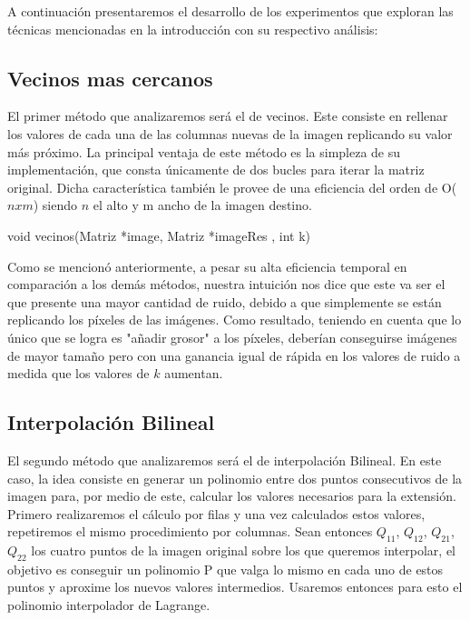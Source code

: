 A continuación presentaremos el desarrollo de los experimentos que exploran las técnicas mencionadas en la introducción con su respectivo análisis:

\subsection{Vecinos mas cercanos}
El primer método que analizaremos será el de vecinos. Este consiste en rellenar los valores de cada una de las columnas
nuevas de la imagen replicando su valor más próximo. La principal ventaja de este método es la simpleza de su implementación, que consta únicamente de dos bucles para iterar la matriz original. Dicha característica también le provee de una eficiencia del orden de O($nxm$) siendo $n$ el alto y m ancho de la imagen destino.

\begin{algorithm}[H]
\begin{algorithmic}[1]\parskip=1mm
\caption{void vecinos(Matriz *image, Matriz *imageRes , int k)}
    \ENDFOR
\ENDFOR
\end{algorithmic}
\end{algorithm}

Como se mencionó anteriormente, a pesar su alta eficiencia temporal en comparación a los demás métodos, nuestra intuición nos dice que este va ser el que presente una mayor cantidad de ruido, debido a que simplemente se están replicando los píxeles de las imágenes. Como resultado, teniendo en cuenta que lo único que se logra es "añadir grosor" a los píxeles, deberían conseguirse imágenes de mayor tamaño pero con una ganancia igual de rápida en los valores de ruido a medida que los valores de $k$ aumentan.

\subsection{Interpolación Bilineal}
El segundo método que analizaremos será el de interpolación Bilineal. En este caso, la idea consiste en generar un polinomio entre
dos puntos consecutivos de la imagen para, por medio de este, calcular los valores necesarios para la extensión. \\
Primero realizaremos el cálculo por filas y una vez calculados estos valores, repetiremos el mismo procedimiento por columnas.
Sean entonces $Q_{11}$, $Q_{12}$, $Q_{21}$, $Q_{22}$ los cuatro puntos de la imagen original sobre los que queremos interpolar, el objetivo es conseguir un polinomio P que valga lo mismo en cada uno de estos puntos y aproxime los nuevos valores intermedios. Usaremos entonces para esto el polinomio interpolador de Lagrange.


